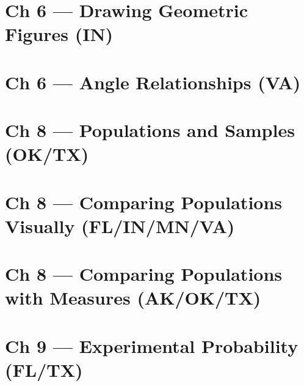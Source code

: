 \documentclass[12pt, fleqn, openany, oneside]{studyGuide}
\begin{document}
\chapter{Ch 6 — Drawing Geometric Figures (IN)}



\chapter{Ch 6 — Angle Relationships (VA)}



\chapter{Ch 8 — Populations and Samples (OK/TX)}



\chapter{Ch 8 — Comparing Populations Visually (FL/IN/MN/VA)}



\chapter{Ch 8 — Comparing Populations with Measures (AK/OK/TX)}



\chapter{Ch 9 — Experimental Probability (FL/TX)}



\printAnswerKey
\end{document}
